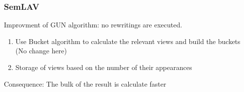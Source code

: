 \documentclass{beamer}
\begin{document}
\begin{frame}
\frametitle{SemLAV}
\begin{center}
Improvment of GUN algorithm: no rewritings are executed.
\begin{enumerate}
\item Use Bucket algorithm to calculate the relevant views and build the buckets (No change here)
\item Storage of views based on the number of their appearances
\end{enumerate}
\alert{Consequence: The bulk of the result is calculate faster}
\end{center}
\end{frame}
\end{document}
